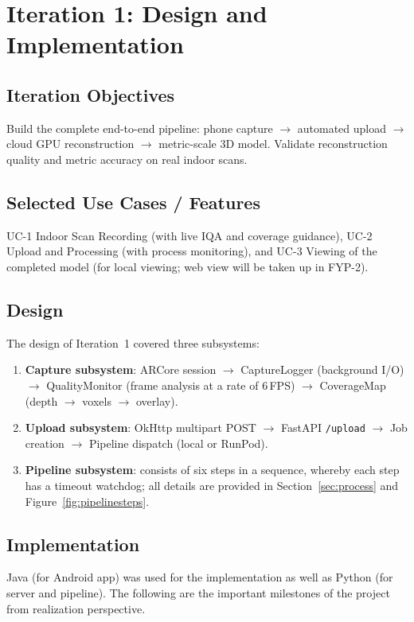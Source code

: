 \chapter{Iteration 1: Design and Implementation}

\section{Iteration Objectives}
Build the complete end-to-end pipeline: phone capture $\rightarrow$ automated upload $\rightarrow$ cloud GPU reconstruction $\rightarrow$ metric-scale 3D model. Validate reconstruction quality and metric accuracy on real indoor scans.

\section{Selected Use Cases / Features}
UC-1 Indoor Scan Recording (with live IQA and coverage guidance), UC-2 Upload and Processing (with process monitoring), and UC-3 Viewing of the completed model (for local viewing; web view will be taken up in FYP-2).

\section{Design}
The design of Iteration~1 covered three subsystems:
\begin{enumerate}
    \item \textbf{Capture subsystem}: ARCore session $\rightarrow$ CaptureLogger (background I/O) $\rightarrow$ QualityMonitor (frame analysis at a rate of 6\,FPS) $\rightarrow$ CoverageMap (depth $\rightarrow$ voxels $\rightarrow$ overlay).
    \item \textbf{Upload subsystem}: OkHttp multipart POST $\rightarrow$ FastAPI \texttt{/upload} $\rightarrow$ Job creation $\rightarrow$ Pipeline dispatch (local or RunPod).
    \item \textbf{Pipeline subsystem}: consists of six steps in a sequence, whereby each step has a timeout watchdog; all details are provided in Section~\ref{sec:process} and Figure~\ref{fig:pipelinesteps}.
\end{enumerate}

\section{Implementation}
Java (for Android app) was used for the implementation as well as Python (for server and pipeline). The following are the important milestones of the project from realization perspective.

